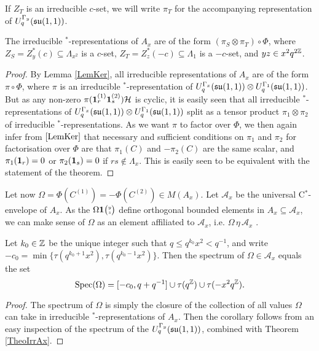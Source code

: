 If $Z_T$ is an irreducible $c$-set, we will write $\pi_T$ for the accompanying representation of $U_q^{\Gamma_y}(\mathfrak{su}(1,1))$. 

\begin{Theorem}\label{TheoIrrAx} The irreducible $^*$-representations of $A_x$ are of the form $(\pi_S\otimes \pi_T)\circ \Phi$, where $Z_S = Z_y^*(c) \subseteq \Lambda_{x^2}$ is a $c$-set, $Z_T = Z_z^*(-c)\subseteq \Lambda_1$ is a $-c$-set, and $yz \in x^2q^{2\mathbb{Z}}$. 
\end{Theorem}
\begin{proof} By Lemma \ref{LemKer}, all irreducible representations of $A_x$ are of the form $\pi \circ \Phi$, where $\pi$ is an irreducible $^*$-representation of $U_q^{\Gamma_x}(\mathfrak{su}(1,1))\otimes U_q^{\Gamma_1}(\mathfrak{su}(1,1))$. But as any non-zero $\pi(\mathbf{1}_r^{(1)}\mathbf{1}_s^{(2)})\mathcal{H}$ is cyclic, it is easily seen that all irreducible $^*$-representations of $U_q^{\Gamma_x}(\mathfrak{su}(1,1))\otimes U_q^{\Gamma_1}(\mathfrak{su}(1,1))$ split as a tensor product $\pi_1\otimes \pi_2$ of irreducible $^*$-representations. As we want $\pi$ to factor over $\Phi$, we then again infer from $\ref{LemKer}$ that necessary and sufficient conditions on $\pi_1$ and $\pi_2$ for factorisation over $\Phi$ are that $\pi_1(C)$ and $-\pi_2(C)$ are the same scalar, and $\pi_1(\mathbf{1}_r)=0$ or $\pi_2(\mathbf{1}_s)=0$ if $rs\notin \Lambda_x$. This is easily seen to be equivalent with the statement of the theorem.
\end{proof}

Let now $\Omega = \Phi(C^{(1)}) = -\Phi(C^{(2)}) \in M(A_x)$. Let $\mathcal{A}_x$ be the universal C$^*$-envelope of $A_x$. As the $\Omega\mathbf{1}{\tiny {\begin{pmatrix} y\\z\end{pmatrix}}}$ define orthogonal bounded elements in $A_x\subseteq \mathcal{A}_x$, we can make sense of $\Omega$ as an element affiliated to $\mathcal{A}_x$, i.e. $\Omega\,\eta\,\mathcal{A}_x$ \cite{Wor2}. 


\begin{Cor} Let $k_0\in \mathbb{Z}$ be the unique integer such that $q\leq q^{k_0}x^2<q^{-1}$, and write $-c_{0} = \min \{\tau(q^{k_0+1}x^2),\tau(q^{k_0-1}x^{2})\}$. Then the spectrum of $\Omega \in \mathcal{A}_x$ equals the set \[\operatorname{\mathrm{Spec}}(\Omega) = \lbrack -c_0,q+q^{-1}\rbrack \cup \tau(q^{\mathbb{Z}})\cup \tau (-x^2q^{\mathbb{Z}}).\]
\end{Cor}
\begin{proof} The spectrum of $\Omega$ is simply the closure of the collection of all values $\Omega$ can take in irreducible $^*$-representations of $A_x$. Then the corollary follows from an easy inspection of the spectrum of the $U_q^{\Gamma_y}(\mathfrak{su}(1,1))$, combined with Theorem \ref{TheoIrrAx}.

\end{proof} 

